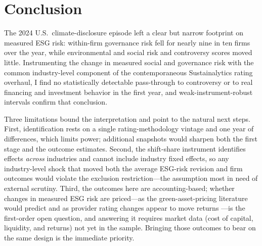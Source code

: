 \documentclass[12pt]{article}
\begin{document}
\section{Conclusion}\label{sec:conclusion}
The 2024 U.S.\ climate-disclosure episode left a clear but narrow footprint on measured ESG risk:
within-firm governance risk fell for nearly nine in ten firms over the year, while environmental
and social risk and controversy scores moved little. Instrumenting the change in measured social
and governance risk with the common industry-level component of the contemporaneous Sustainalytics
rating overhaul, I find no statistically detectable pass-through to controversy or to real
financing and investment behavior in the first year, and weak-instrument-robust intervals confirm
that conclusion.

Three limitations bound the interpretation and point to the natural next steps. First,
identification rests on a single rating-methodology vintage and one year of differences, which
limits power; additional snapshots would sharpen both the first stage and the outcome estimates.
Second, the shift-share instrument identifies effects \emph{across} industries and cannot include
industry fixed effects, so any industry-level shock that moved both the average ESG-risk revision
and firm outcomes would violate the exclusion restriction---the assumption most in need of
external scrutiny. Third, the outcomes here are accounting-based; whether changes in measured ESG
risk are priced---as the green-asset-pricing literature would predict
\citep{PastorStambaughTaylor2022_green_returns, PedersenFitzgibbonsPomorski2021_esg_frontier} and as
provider rating changes appear to move returns \citep{GalemaGerritsen2025_esg_rating_changes}---is
the first-order open question, and answering it requires market data (cost of capital, liquidity, and
returns) not yet in the sample. Bringing those outcomes to bear on the same design is the immediate
priority.



\end{document}
